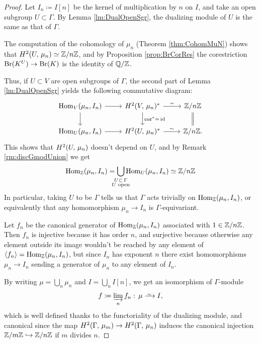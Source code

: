 \documentclass[a4paper, oneside]{memoir}
\begin{document}
\begin{proof}
    Let $I_n\coloneqq I[n]$ be the kernel of multiplication by $n$ on $I$, and take an open subgroup $U\subset\Gamma$. By Lemma \ref{lm:DualOpenSgr}, the dualizing module of $U$ is the same as that of $\Gamma$.

    The computation of the cohomology of $\mu_n$ (Theorem \ref{thm:CohomMuN}) shows that \(H^{2}( U, \, \mu_n )\simeq\mathbb{Z}/n\mathbb{Z}\), and by Proposition \ref{prop:BrCorRes} the corestriction $\mathrm{Br}(K^U)\to\mathrm{Br}(K)$ is the identity of $\mathbb{Q}/\mathbb{Z}$.

    Thus, if $U\subset V$ are open subgroups of $\Gamma$, the second part of Lemma \ref{lm:DualOpenSgr} yields the following commutative diagram:
    \begin{equation}\label{eq:FuncDual}
        \begin{tikzcd}
            \Hom_V(\mu_n,I_n)
            \ar[d]
            \ar[r] &
            \H{2}{V}{\mu_n}^*
            \ar[d, "\Cor^*=\,\id"]
            \rar["\sim"] &
            \Zn
            \ar[equal, d] \\
            \Hom_U(\mu_n,I_n)
            \ar[r] &
            \H{2}{U}{\mu_n}^*
            \rar["\sim"] &
            \Zn.
        \end{tikzcd}
    \end{equation}
    This shows that \(H^{2}( U, \, \mu_n )\) doesn't depend on \(U\), and by Remark \ref{rm:discGmodUnion} we get
    \[
        \Hom_\Z(\mu_n,I_n)=\bigcup_{\mathclap{\substack{U\subset\,\Gamma\\U\text{ open}}}}{\Hom_U(\mu_n,I_n)}\simeq\Zn
    \]
    In particular, taking $U$ to be $\Gamma$ tells us that $\Gamma$ acts trivially on $\operatorname{Hom}_{\mathbb{Z}}(\mu_n,I_n)$, or equivalently that any homomorphism $\mu_n\to I_n$ is $\Gamma$-equivariant.

    Let $f_n$ be the canonical generator of $\operatorname{Hom}_{\mathbb{Z}}(\mu_n,I_n)$ associated with $1\in\mathbb{Z}/n\mathbb{Z}$. Then $f_n$ is injective because it has order $n$, and surjective because otherwise any
    element outside its image wouldn't be reached by any element of $\langle f_n\rangle=\operatorname{Hom}_{\mathbb{Z}}(\mu_n,I_n)$, but since $I_n$ has exponent $n$ there exist homomorphisms $\mu_n\to I_n$ sending a generator of $\mu_n$ to any element of $I_n$.

    By writing $\mu = \bigcup_n{\mu_n}$ and $I = \bigcup_n{I[n]}$, we get an isomorphism of $\Gamma$-module
    \[
        f\coloneqq \varinjlim_n f_n:\, \mu\Iso I,
    \]
    which is well defined thanks to the functoriality of the dualizing
    module, and canonical since the map $H^{2}( \Gamma, \, \mu_m )\to H^{2}( \Gamma, \, \mu_n )$ induces the canonical injection $\mathbb{Z}/m\mathbb{Z}\hookrightarrow\mathbb{Z}/n\mathbb{Z}$ if $m$ divides $n$.
\end{proof}
\end{document}
